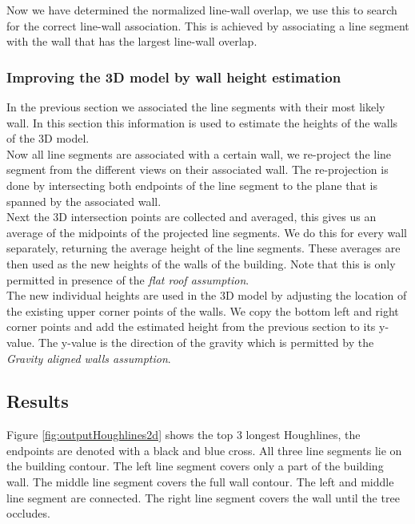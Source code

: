 	Now we have determined the normalized line-wall overlap, we use this to
	search for the correct line-wall association. This is achieved by
	associating a line segment with the wall that has the largest line-wall
	overlap.\\

\subsubsection{Improving the 3D model by wall height estimation}
	In the previous section we associated the line segments with their most
	likely wall. In this section this information is used to estimate the
	heights of the walls of the 3D model. \\
	Now all line segments are associated with a certain wall, we re-project the
	line segment from the different views on their associated wall. The
	re-projection is done by intersecting both endpoints of the line segment to
	the plane that is spanned by the associated wall.\\
	Next the 3D intersection points are collected and averaged, this gives us
	an average of the midpoints of the projected line segments. We do this for
	every wall separately, returning the average height of the line segments.
	These averages are then used as the new heights of the walls of the
	building.  Note that this is only permitted in presence of the \emph{flat roof assumption}.\\
	The new individual heights are used in the 3D model by adjusting the
	location of the existing upper corner points of the walls. We copy the
	bottom left and right corner points and add the estimated height from the
	previous section to its y-value. The y-value is the direction of the
	gravity which is permitted by the \emph{Gravity aligned walls assumption}.

\newpage
\subsection{Results}
\label{sec:ResultImprove}
\clearpage
{}
Figure \ref{fig:outputHoughlines2d} shows the top 3 longest Houghlines, the
endpoints are denoted with a black and blue cross. All three line segments lie on the
building contour.  The left line segment covers only a part of the building wall. The
middle line segment covers the full wall contour. The left and middle line segment are connected. The
right line segment covers the wall until the tree occludes.\\

